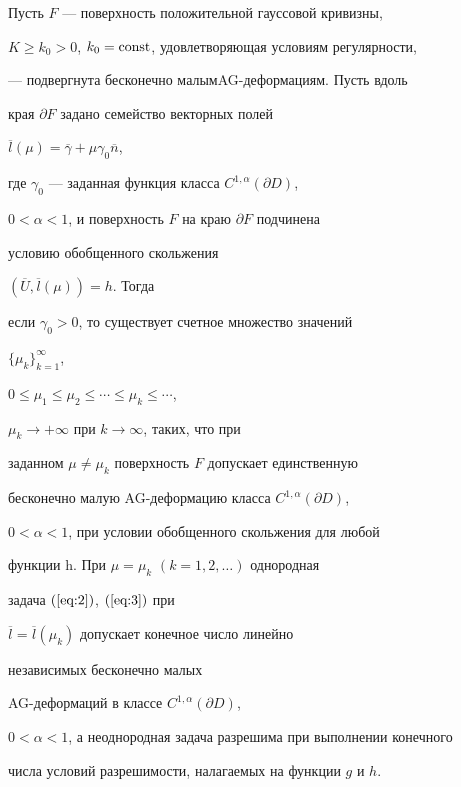 \begin{thm}


Пусть $F$ --- поверхность положительной гауссовой кривизны,


$K \ge k_0> 0$, $k_0=\operatorname{const}$, удовлетворяющая условиям регулярности, 


--- подвергнута бесконечно малым\linebreak AG-деформациям. Пусть вдоль 


края $\partial F$ задано семейство векторных полей


$\overline l (\mu)=\overline \gamma+\mu \gamma_0 \overline n $,


где $\gamma_0 $ --- заданная функция класса $C^{1,\alpha} ({\partial D})$,


$0 < \alpha < 1$, и поверхность $F$ на краю $\partial F$ подчинена 


условию обобщенного скольжения


$ ({\overline U ,\overline l (\mu)})=h$. Тогда


если $\gamma_0 > 0$, то существует счетное множество значений


$ \{ {\mu _k } \}_{k=1}^\infty$,


$0 \le \mu_1 \le \mu_2 \le \dotsb \le \mu_k \le \dotsb$,


$\mu_k \to+\infty$ при $k \to \infty$, таких, что при 


заданном $\mu \ne \mu_k$ поверхность $F$ допускает единственную 


бесконечно малую AG-деформацию класса $C^{1,\alpha } ({\partial D})$,


$0 < \alpha < 1$, при условии обобщенного скольжения для любой


функции h. При $\mu=\mu_k$ $({k=1,2,\dotsc})$ однородная 


задача $(\ref{eq:2})$, $(\ref{eq:3})$ при


$\overline l=\overline l (\mu_k)$ допускает конечное число линейно 


независимых бесконечно малых 


AG-деформаций в классе $C^{1,\alpha } ({\partial D})$, 


$0 < \alpha < 1$, а неоднородная задача разрешима при выполнении конечного


числа условий разрешимости, налагаемых на функции $g$ и $h$.


\end{thm}





